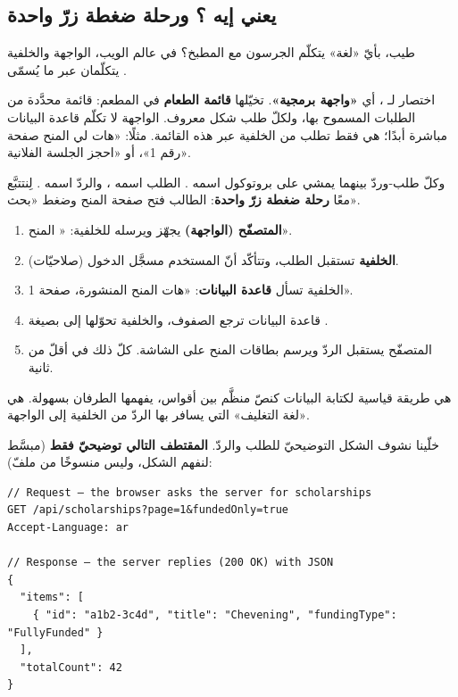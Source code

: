 \subsection{يعني إيه ؟ ورحلة ضغطة زرّ واحدة}

طيب، بأيّ «لغة» يتكلّم الجرسون مع المطبخ؟ في عالم الويب، الواجهة والخلفية يتكلّمان
عبر ما يُسمّى .

\begin{idea}
 اختصار لـ ، أي \textbf{«واجهة برمجية»}.
تخيّلها \textbf{قائمة الطعام} في المطعم: قائمة محدَّدة من الطلبات المسموح بها، ولكلّ طلب
شكل معروف. الواجهة لا تكلّم قاعدة البيانات مباشرة أبدًا؛ هي فقط تطلب من الخلفية عبر هذه
القائمة. مثلًا: «هات لي المنح صفحة رقم 1»، أو «احجز الجلسة الفلانية».
\end{idea}

وكلّ طلب-وردّ بينهما يمشي على بروتوكول اسمه . الطلب اسمه ،
والردّ اسمه . لِنتتبَّع معًا \textbf{رحلة ضغطة زرّ واحدة}: الطالب فتح صفحة
المنح وضغط «بحث».

\begin{enumerate}
\item \textbf{المتصفّح (الواجهة)} يجهّز  ويرسله للخلفية: « المنح».
\item \textbf{الخلفية} تستقبل الطلب، وتتأكّد أنّ المستخدم مسجَّل الدخول (صلاحيّات).
\item الخلفية تسأل \textbf{قاعدة البيانات}: «هات المنح المنشورة، صفحة 1».
\item قاعدة البيانات ترجع الصفوف، والخلفية تحوّلها إلى  بصيغة .
\item المتصفّح يستقبل الردّ ويرسم بطاقات المنح على الشاشة. كلّ ذلك في أقلّ من ثانية.
\end{enumerate}

\begin{note}[ما هو \en{JSON}؟]
 هي طريقة قياسية لكتابة البيانات كنصّ منظَّم بين أقواس، يفهمها الطرفان بسهولة.
هي «لغة التغليف» التي يسافر بها الردّ من الخلفية إلى الواجهة.
\end{note}

خلّينا نشوف الشكل التوضيحيّ للطلب والردّ. \textbf{المقتطف التالي توضيحيّ فقط} (مبسَّط
لنفهم الشكل، وليس منسوخًا من ملفّ):

\begin{english}
\begin{lstlisting}[language={}]
// Request — the browser asks the server for scholarships
GET /api/scholarships?page=1&fundedOnly=true
Accept-Language: ar

// Response — the server replies (200 OK) with JSON
{
  "items": [
    { "id": "a1b2-3c4d", "title": "Chevening", "fundingType": "FullyFunded" }
  ],
  "totalCount": 42
}
\end{lstlisting}
\end{english}

